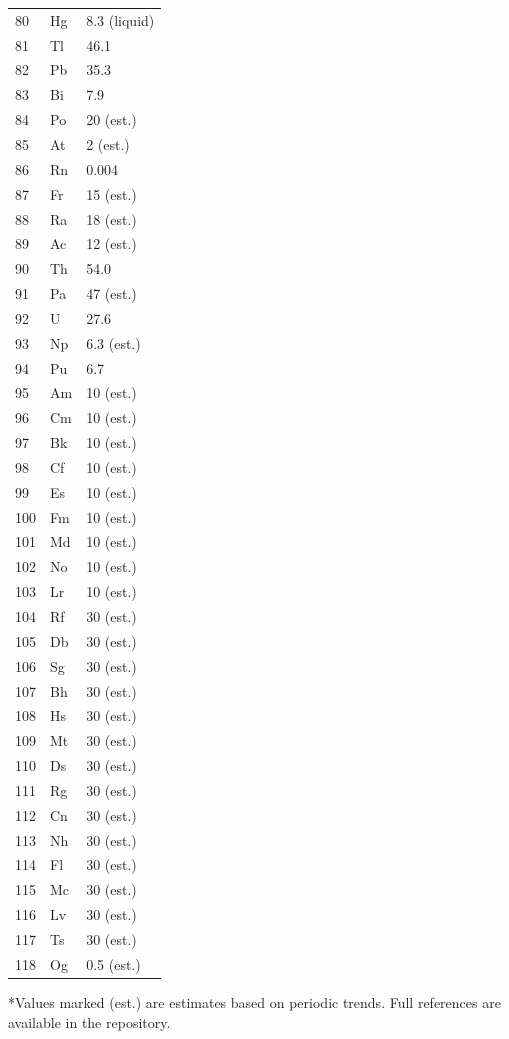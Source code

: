 \documentclass[12pt,a4paper]{article}
\begin{document}
\begin{longtable}{p{0.6cm}p{1.2cm}p{1.5cm}}
		80 & Hg & 8.3 (liquid) \\
		81 & Tl & 46.1 \\
		82 & Pb & 35.3 \\
		83 & Bi & 7.9 \\
		84 & Po & 20 (est.) \\
		85 & At & 2 (est.) \\
		86 & Rn & 0.004 \\
		87 & Fr & 15 (est.) \\
		88 & Ra & 18 (est.) \\
		89 & Ac & 12 (est.) \\
		90 & Th & 54.0 \\
		91 & Pa & 47 (est.) \\
		92 & U  & 27.6 \\
		93 & Np & 6.3 (est.) \\
		94 & Pu & 6.7 \\
		95 & Am & 10 (est.) \\
		96 & Cm & 10 (est.) \\
		97 & Bk & 10 (est.) \\
		98 & Cf & 10 (est.) \\
		99 & Es & 10 (est.) \\
		100& Fm & 10 (est.) \\
		101& Md & 10 (est.) \\
		102& No & 10 (est.) \\
		103& Lr & 10 (est.) \\
		104& Rf & 30 (est.) \\
		105& Db & 30 (est.) \\
		106& Sg & 30 (est.) \\
		107& Bh & 30 (est.) \\
		108& Hs & 30 (est.) \\
		109& Mt & 30 (est.) \\
		110& Ds & 30 (est.) \\
		111& Rg & 30 (est.) \\
		112& Cn & 30 (est.) \\
		113& Nh & 30 (est.) \\
		114& Fl & 30 (est.) \\
		115& Mc & 30 (est.) \\
		116& Lv & 30 (est.) \\
		117& Ts & 30 (est.) \\
		118& Og & 0.5 (est.) \\
		\bottomrule
	\end{longtable}
	*Values marked (est.) are estimates based on periodic trends. Full references are available in the repository.
	
\end{document}
